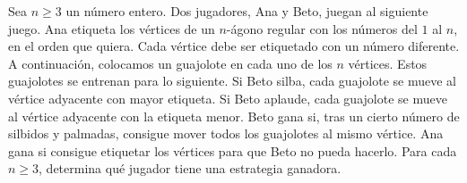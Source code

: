 Sea $n\ge 3$ un número entero. Dos jugadores, Ana y Beto, juegan al siguiente juego. Ana etiqueta los vértices de un $n$-ágono regular con los números del $1$ al $n$, en el orden que quiera. Cada vértice debe ser etiquetado con un número diferente. A continuación, colocamos un guajolote en cada uno de los $n$ vértices.  \newline 
Estos guajolotes se entrenan para lo siguiente. Si Beto silba, cada guajolote se mueve al vértice adyacente con mayor etiqueta. Si Beto aplaude, cada guajolote se mueve al vértice adyacente con la etiqueta menor.  \newline 
Beto gana si, tras un cierto número de silbidos y palmadas, consigue mover todos los guajolotes al mismo vértice. Ana gana si consigue etiquetar los vértices para que Beto no pueda hacerlo. Para cada $n\ge 3$, determina qué jugador tiene una estrategia ganadora.
